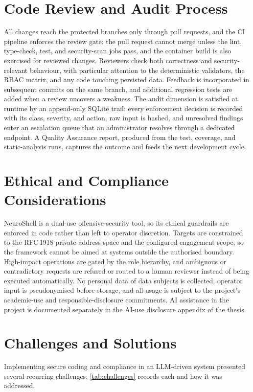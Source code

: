 \documentclass[10pt,journal,onecolumn]{IEEEtran}
\begin{document}
\section{Code Review and Audit Process}\label{sec:review}
All changes reach the protected branches only through pull requests, and
the CI pipeline enforces the review gate: the pull request cannot merge
unless the lint, type-check, test, and security-scan jobs pass, and the
container build is also exercised for reviewed changes. Reviewers check
both correctness and security-relevant behaviour, with particular
attention to the deterministic validators, the RBAC matrix, and any code
touching persisted data. Feedback is incorporated in subsequent commits
on the same branch, and additional regression tests are added when a
review uncovers a weakness. The audit dimension is satisfied at runtime
by an append-only SQLite trail: every enforcement decision is recorded
with its class, severity, and action, raw input is hashed, and unresolved
findings enter an escalation queue that an administrator resolves through
a dedicated endpoint. A Quality Assurance report, produced from the test,
coverage, and static-analysis runs, captures the outcome and feeds the
next development cycle.

\section{Ethical and Compliance Considerations}
NeuroShell is a dual-use offensive-security tool, so its ethical
guardrails are enforced in code rather than left to operator discretion.
Targets are constrained to the RFC\,1918 private-address space and the
configured engagement scope, so the framework cannot be aimed at systems
outside the authorised boundary. High-impact operations are gated by the
role hierarchy, and ambiguous or contradictory requests are refused or
routed to a human reviewer instead of being executed automatically. No
personal data of data subjects is collected, operator input is
pseudonymised before storage, and all usage is subject to the project's
academic-use and responsible-disclosure commitments. AI assistance in the
project is documented separately in the AI-use disclosure appendix of the
thesis.

\section{Challenges and Solutions}
Implementing secure coding and compliance in an LLM-driven system
presented several recurring challenges; \cref{tab:challenges} records
each and how it was addressed.
\end{document}

